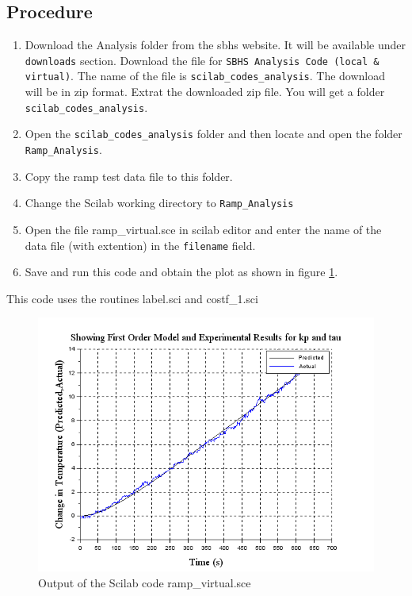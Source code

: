 \subsection{Procedure}
\begin{enumerate}
\item Download the Analysis folder from the sbhs website. It will be available under {\tt downloads} section.  Download the file for {\tt SBHS Analysis Code (local \& virtual)}. The name of the file is {\tt scilab\_codes\_analysis}. The download will be in zip format. Extrat the downloaded zip file. You will get a folder {\tt scilab\_codes\_analysis}. 
\item Open the {\tt scilab\_codes\_analysis} folder and then locate and open the folder {\tt Ramp\_Analysis}.
 \item Copy the ramp test data file to this folder.
 \item Change the Scilab working directory to  {\tt Ramp\_Analysis}
 \item Open the file {\ttfamily ramp\_virtual.sce} in scilab editor and enter the name of the data file (with extention) in the {\tt filename} field. 
\item Save and run this code and obtain the plot as shown in figure \ref{firstorder_ramp}. 
\end{enumerate}
This code uses the routines {\ttfamily label.sci} and {\ttfamily costf\_1.sci}

\begin{figure} 
\centering
\includegraphics[width=\linewidth]{Ramp-test_manual/ramp-analysis.png}
\caption{Output of the Scilab code {\ttfamily ramp\_virtual.sce}}
\label{firstorder_ramp}
\end{figure} \label{firstorderplot}

